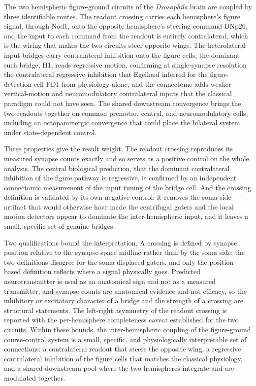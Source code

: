 \documentclass[11pt]{article}
\begin{document}
The two hemispheric figure-ground circuits of the \textit{Drosophila} brain are coupled by three
identifiable routes. The readout crossing carries each hemisphere's figure signal, through Nod1,
onto the opposite hemisphere's steering command DNp26, and the input to each command from the
readout is entirely contralateral, which is the wiring that makes the two circuits steer opposite
wings. The heterolateral input bridges carry contralateral inhibition onto the figure cells; the
dominant such bridge, H1, reads regressive motion, confirming at single-synapse resolution the
contralateral regressive inhibition that Egelhaaf inferred for the figure-detection cell FD1 from
physiology alone, and the connectome adds weaker vertical-motion and neuromodulatory contralateral
inputs that the classical paradigm could not have seen. The shared downstream convergence brings
the two readouts together on common premotor, central, and neuromodulatory cells, including an
octopaminergic convergence that could place the bilateral system under state-dependent control.

Three properties give the result weight. The readout crossing reproduces its measured synapse
counts exactly and so serves as a positive control on the whole analysis. The central biological
prediction, that the dominant contralateral inhibition of the figure pathway is regressive, is
confirmed by an independent connectomic measurement of the input tuning of the bridge cell. And
the crossing definition is validated by its own negative control: it removes the soma-side artifact
that would otherwise have made the centrifugal gaters and the local motion detectors appear to
dominate the inter-hemispheric input, and it leaves a small, specific set of genuine bridges.

Two qualifications bound the interpretation. A crossing is defined by synapse position relative to
the synapse-space midline rather than by the soma side; the two definitions disagree for the
soma-displaced gaters, and only the position-based definition reflects where a signal physically
goes. Predicted neurotransmitter is used as an anatomical sign and not as a measured transmitter,
and synapse counts are anatomical evidence and not efficacy, so the inhibitory or excitatory
character of a bridge and the strength of a crossing are structural statements. The left-right
asymmetry of the readout crossing is reported with the per-hemisphere completeness caveat
established for the two circuits. Within these bounds, the inter-hemispheric coupling of the
figure-ground course-control system is a small, specific, and physiologically interpretable set of
connections: a contralateral readout that steers the opposite wing, a regressive contralateral
inhibition of the figure cells that matches the classical physiology, and a shared downstream pool
where the two hemispheres integrate and are modulated together.
\end{document}
